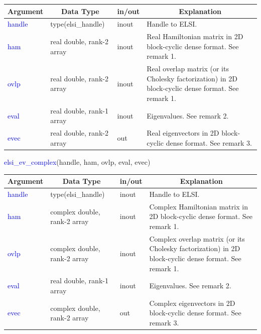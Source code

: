 \documentclass{report}
\begin{document}
\begin{tabular}[]{|p{20mm}|p{45mm}|p{15mm}|p{85mm}|}
\hline
\multicolumn{1}{|c|}{\textbf{Argument}} & \multicolumn{1}{c|}{\textbf{Data Type}} & \multicolumn{1}{c|}{\textbf{in/out}} & \multicolumn{1}{c|}{\textbf{Explanation}}\\
\hline
\textcolor{blue}{handle} & type(elsi\_handle)        & inout & Handle to ELSI.\\
\hline
\textcolor{blue}{ham}    & real double, rank-2 array & inout & Real Hamiltonian matrix in 2D block-cyclic dense format. See remark 1.\\
\hline
\textcolor{blue}{ovlp}   & real double, rank-2 array & inout & Real overlap matrix (or its Cholesky factorization) in 2D block-cyclic dense format. See remark 1.\\
\hline
\textcolor{blue}{eval}   & real double, rank-1 array & inout & Eigenvalues. See remark 2.\\
\hline
\textcolor{blue}{evec}   & real double, rank-2 array & out   & Real eigenvectors in 2D block-cyclic dense format. See remark 3.\\
\hline
\end{tabular}

\newpage
\begin{labeling}{\hspace{6cm}}
\item [\hspace{0.3cm} \textcolor{blue}{elsi\_ev\_complex}(handle, ham, ovlp, eval, evec)]
\end{labeling}

\begin{tabular}[]{|p{20mm}|p{45mm}|p{15mm}|p{85mm}|}
\hline
\multicolumn{1}{|c|}{\textbf{Argument}} & \multicolumn{1}{c|}{\textbf{Data Type}} & \multicolumn{1}{c|}{\textbf{in/out}} & \multicolumn{1}{c|}{\textbf{Explanation}}\\
\hline
\textcolor{blue}{handle} & type(elsi\_handle)           & inout & Handle to ELSI.\\
\hline
\textcolor{blue}{ham}    & complex double, rank-2 array & inout & Complex Hamiltonian matrix in 2D block-cyclic dense format. See remark 1.\\
\hline
\textcolor{blue}{ovlp}   & complex double, rank-2 array & inout & Complex overlap matrix (or its Cholesky factorization) in 2D block-cyclic dense format. See remark 1.\\
\hline
\textcolor{blue}{eval}   & real double, rank-1 array    & inout & Eigenvalues. See remark 2.\\
\hline
\textcolor{blue}{evec}   & complex double, rank-2 array & out   & Complex eigenvectors in 2D block-cyclic dense format. See remark 3.\\
\hline
\end{tabular}
\end{document}
